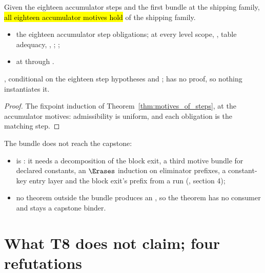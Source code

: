 \begin{theorem}
\label{thm:motives_of_steps_acc}
\leanok
{}
 Given the eighteen accumulator steps and the first bundle at the shipping family, \hl{all
eighteen accumulator motives hold} of the shipping family.
\begin{itemize}
\item {} the eighteen accumulator step obligations;  at every level scope,
, table adequacy, , ; ;
\item {}  at  through .
\end{itemize}
 \stProved{}, conditional on the eighteen step hypotheses and \stAssumed{} ;
\stOpen{}  has no proof, so nothing instantiates it.
\end{theorem}
\begin{proof}
\leanok
{}
 The fixpoint induction of Theorem~\ref{thm:motives_of_steps}, at the accumulator motives:
admissibility is uniform, and each obligation is the matching step.
\end{proof}

\begin{remark}
 The bundle does not reach the capstone:
\begin{itemize}
\item {} is \stOpen{}: it needs a decomposition of the block exit, a third motive bundle for
declared constants, an $\Erases$ induction on eliminator prefixes, a constant-key entry layer and the
block exit's prefix from a run (, section 4);
\item no theorem outside the bundle produces an , so the theorem has no consumer and
 stays a capstone binder.
\end{itemize}
\end{remark}

\section{What T8 does not claim; four refutations}
\label{sec:refinement:scope}

